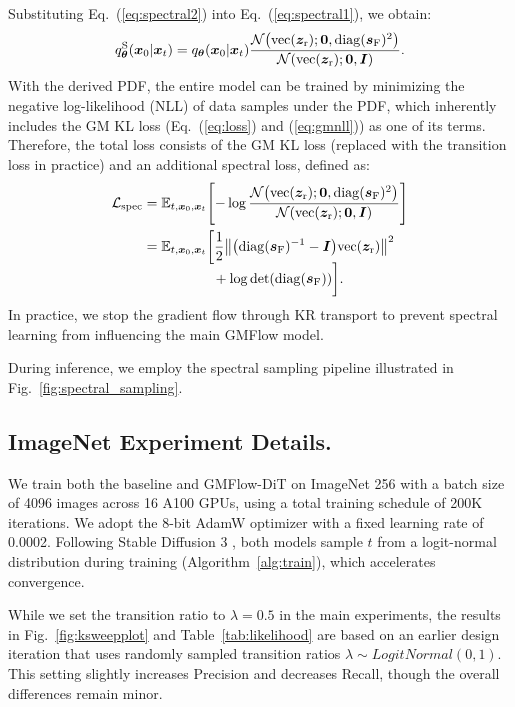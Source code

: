 \documentclass{article}
\def\vtheta{{\bm{\theta}}}
\def\vs{{\bm{s}}}
\def\vx{{\bm{x}}}
\def\vz{{\bm{z}}}
\def\mI{{\bm{I}}}
\newcommand{\E}{\mathbb{E}}
\newcommand{\Ls}{\mathcal{L}}
\theoremstyle{custom}
\theoremstyle{definition}
\theoremstyle{remark}
\let\originalleft\left
\let\originalright\right
\renewcommand{\left}{\mathopen{}\mathclose\bgroup\originalleft}
\renewcommand{\right}{\aftergroup\egroup\originalright}
\newcommand{\diag}{\mathop{\mathrm{diag}}}
\begin{document}
Substituting Eq.~(\ref{eq:spectral2}) into Eq.~(\ref{eq:spectral1}), we obtain:
\begin{equation}
    q_\vtheta^\text{S}(\vx_0|\vx_t) = q_\vtheta (\vx_0|\vx_t) \frac{\mathcal{N}\left(\mathrm{vec}(\vz_\text{r}); \bm{0}, \diag(\vs_\text{F})^2\right)}{\mathcal{N}(\mathrm{vec}(\vz_\text{r}); \bm{0}, \mI)}.
    \label{eq:gmspdf}
\end{equation}
With the derived PDF, the entire model can be trained by minimizing the negative log-likelihood (NLL) of data samples under the PDF, which inherently includes the GM KL loss (Eq.~(\ref{eq:loss}) and (\ref{eq:gmnll})) as one of its terms. Therefore, the total loss consists of the GM KL loss (replaced with the transition loss in practice) and an additional spectral loss, defined as:
\begin{align}
    \Ls_\text{spec} &= \E_{t,\vx_0,\vx_t} \left[-\log \frac{\mathcal{N}\left(\mathrm{vec}(\vz_\text{r}); \bm{0}, \diag(\vs_\text{F})^2\right)}{\mathcal{N}(\mathrm{vec}(\vz_\text{r}); \bm{0}, \mI)}\right] \notag\\
    &= \E_{t,\vx_0,\vx_t} \bigg[\frac{1}{2} \left\| \left(\diag(\vs_\text{F})^{-1} - \mI \right) \mathrm{vec}(\vz_\text{r}) \right\|^2 \notag\\[-0.5em]
    &\qquad\qquad\quad + \log \det (\diag(\vs_\text{F})) \bigg].
    \label{eq:specloss}
\end{align}
In practice, we stop the gradient flow through KR transport to prevent spectral learning from influencing the main GMFlow model.

During inference, we employ the spectral sampling pipeline illustrated in Fig.~\ref{fig:spectral_sampling}.




\subsection{ImageNet Experiment Details.}
\label{sec:imagenetdetails}

We train both the baseline and GMFlow-DiT on ImageNet 256 with a batch size of 4096 images across 16 A100 GPUs, using a total training schedule of 200K iterations. We adopt the 8-bit AdamW \cite{dettmers20228bit,adamw} optimizer with a fixed learning rate of 0.0002. Following Stable Diffusion 3 \cite{sd3}, both models sample $t$ from a logit-normal distribution during training  (Algorithm~\ref{alg:train}), which accelerates convergence.

While we set the transition ratio to $\lambda=0.5$ in the main experiments, the results in Fig.~\ref{fig:ksweepplot} and Table~\ref{tab:likelihood} are based on an earlier design iteration that uses randomly sampled transition ratios $\lambda \sim \mathit{LogitNormal}(0, 1)$. This setting slightly increases Precision and decreases Recall, though the overall differences remain minor.
\end{document}
